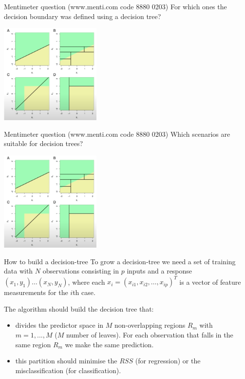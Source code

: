 \documentclass[notes]{beamer}          %
\begin{document}
\begin{frame}{Mentimeter question (www.menti.com code 8880 0203)}
For which ones the decision boundary was defined using a decision tree?
\begin{center}
\includegraphics[height=5cm]{../figures/week_2_classification/Question_decision_tree}  
\end{center}
\end{frame}

\begin{frame}{Mentimeter question (www.menti.com code 8880 0203)}
Which scenarios are suitable for decision trees?
\begin{center}
\includegraphics[height=5cm]{../figures/week_2_classification/Question_decision_tree}  
\end{center}
\end{frame}



\begin{frame}{How to build a decision-tree}
To grow a decision-tree we need a set of training data with $N$ observations consisting in $p$ inputs and a response
$(x_1,y_1) \dots (x_N,y_N)$, where each $x_i=(x_{i1}, x_{i2}, \dots, x_{ip})^T$ is a vector of feature measurements for the $i$th case.

\vspace{0.5cm}

The algorithm should build the decision tree that:

\begin{itemize}
\item divides the predictor space in $M$ non-overlapping regions $R_m$ with $m=1,...,M$ ($M$ number of leaves). For each observation that falls in the same region $R_m$ we make the same prediction.
\item this partition should minimise the $RSS$ (for regression) or the misclassification (for classification).
\end{itemize}
\end{frame}
\end{document}
